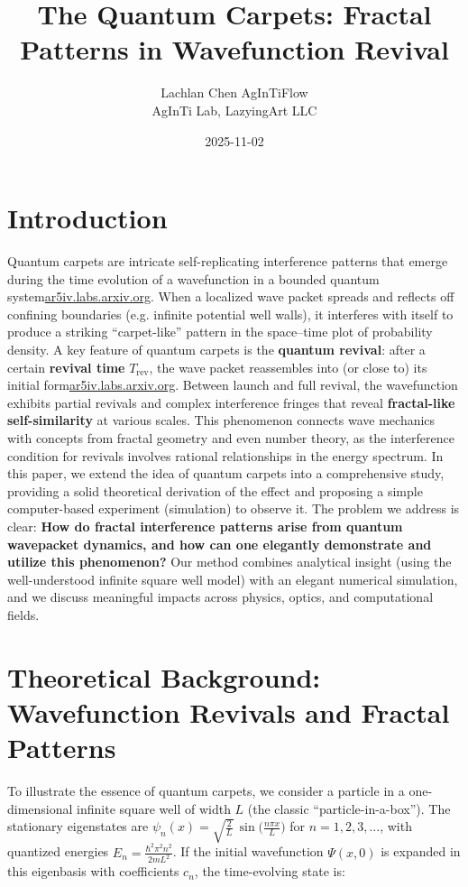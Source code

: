 \documentclass[11pt,a4paper]{article}
\title{The Quantum Carpets: Fractal Patterns in Wavefunction Revival}
\author{\begin{tabular}{c}Lachlan Chen \quad AgInTiFlow\\AgInTi Lab, LazyingArt LLC\end{tabular}}
\date{2025-11-02}
\begin{document}
\maketitle


\section{Introduction}

Quantum carpets are intricate self-replicating interference patterns that emerge during the time evolution of a wavefunction in a bounded quantum system\href{https://ar5iv.labs.arxiv.org/html/1808.09708#:~:text=“quantum carpet”%2C which was introduced,( 25}{ar5iv.labs.arxiv.org}. When a localized wave packet spreads and reflects off confining boundaries (e.g. infinite potential well walls), it interferes with itself to produce a striking “carpet-like” pattern in the space–time plot of probability density. A key feature of quantum carpets is the \textbf{quantum revival}: after a certain \textbf{revival time} $T_{\text{rev}}$, the wave packet reassembles into (or close to) its initial form\href{https://ar5iv.labs.arxiv.org/html/1808.09708#:~:text=“quantum carpet”%2C which was introduced,( 25}{ar5iv.labs.arxiv.org}. Between launch and full revival, the wavefunction exhibits partial revivals and complex interference fringes that reveal \textbf{fractal-like self-similarity} at various scales. This phenomenon connects wave mechanics with concepts from fractal geometry and even number theory, as the interference condition for revivals involves rational relationships in the energy spectrum. In this paper, we extend the idea of quantum carpets into a comprehensive study, providing a solid theoretical derivation of the effect and proposing a simple computer-based experiment (simulation) to observe it. The problem we address is clear: \textbf{How do fractal interference patterns arise from quantum wavepacket dynamics, and how can one elegantly demonstrate and utilize this phenomenon?} Our method combines analytical insight (using the well-understood infinite square well model) with an elegant numerical simulation, and we discuss meaningful impacts across physics, optics, and computational fields.

\section{Theoretical Background: Wavefunction Revivals and Fractal Patterns}

To illustrate the essence of quantum carpets, we consider a particle in a one-dimensional infinite square well of width $L$ (the classic “particle-in-a-box”). The stationary eigenstates are $\psi_n(x)=\sqrt{\frac{2}{L}}\,\sin\big(\tfrac{n\pi x}{L}\big)$ for $n=1,2,3,\dots$, with quantized energies $E_n=\tfrac{\hbar^2\pi^2 n^2}{2mL^2}$. If the initial wavefunction $\Psi(x,0)$ is expanded in this eigenbasis with coefficients $c_n$, the time-evolving state is:
\end{document}
